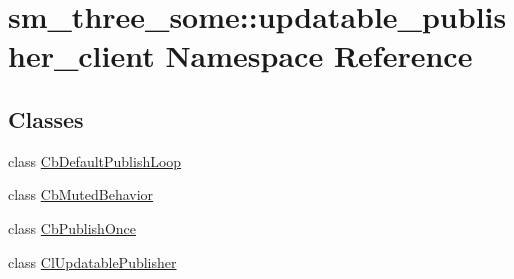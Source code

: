\hypertarget{namespacesm__three__some_1_1updatable__publisher__client}{}\section{sm\+\_\+three\+\_\+some\+:\+:updatable\+\_\+publisher\+\_\+client Namespace Reference}
\label{namespacesm__three__some_1_1updatable__publisher__client}
\subsection*{Classes}
\begin{DoxyCompactItemize}
\item 
class \hyperlink{classsm__three__some_1_1updatable__publisher__client_1_1CbDefaultPublishLoop}{Cb\+Default\+Publish\+Loop}
\item 
class \hyperlink{classsm__three__some_1_1updatable__publisher__client_1_1CbMutedBehavior}{Cb\+Muted\+Behavior}
\item 
class \hyperlink{classsm__three__some_1_1updatable__publisher__client_1_1CbPublishOnce}{Cb\+Publish\+Once}
\item 
class \hyperlink{classsm__three__some_1_1updatable__publisher__client_1_1ClUpdatablePublisher}{Cl\+Updatable\+Publisher}
\end{DoxyCompactItemize}
